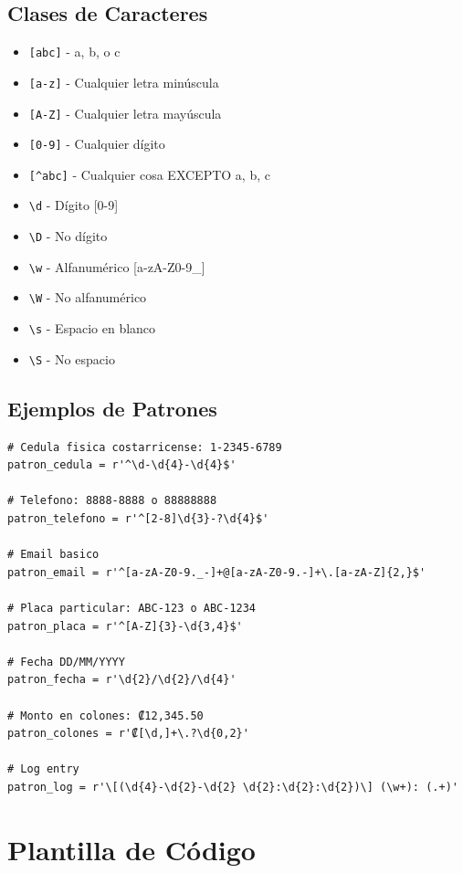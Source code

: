\documentclass[11pt,letterpaper]{article}
\begin{document}
\subsection{Clases de Caracteres}

\begin{itemize}
    \item \texttt{[abc]} - a, b, o c
    \item \texttt{[a-z]} - Cualquier letra minúscula
    \item \texttt{[A-Z]} - Cualquier letra mayúscula
    \item \texttt{[0-9]} - Cualquier dígito
    \item \texttt{[\^{}abc]} - Cualquier cosa EXCEPTO a, b, c
    \item \texttt{\textbackslash d} - Dígito [0-9]
    \item \texttt{\textbackslash D} - No dígito
    \item \texttt{\textbackslash w} - Alfanumérico [a-zA-Z0-9\_]
    \item \texttt{\textbackslash W} - No alfanumérico
    \item \texttt{\textbackslash s} - Espacio en blanco
    \item \texttt{\textbackslash S} - No espacio
\end{itemize}

\subsection{Ejemplos de Patrones}

\begin{lstlisting}[caption={Ejemplos de patrones regex comunes}]
# Cedula fisica costarricense: 1-2345-6789
patron_cedula = r'^\d-\d{4}-\d{4}$'

# Telefono: 8888-8888 o 88888888
patron_telefono = r'^[2-8]\d{3}-?\d{4}$'

# Email basico
patron_email = r'^[a-zA-Z0-9._-]+@[a-zA-Z0-9.-]+\.[a-zA-Z]{2,}$'

# Placa particular: ABC-123 o ABC-1234
patron_placa = r'^[A-Z]{3}-\d{3,4}$'

# Fecha DD/MM/YYYY
patron_fecha = r'\d{2}/\d{2}/\d{4}'

# Monto en colones: ₡12,345.50
patron_colones = r'₡[\d,]+\.?\d{0,2}'

# Log entry
patron_log = r'\[(\d{4}-\d{2}-\d{2} \d{2}:\d{2}:\d{2})\] (\w+): (.+)'
\end{lstlisting}

\section{Plantilla de Código}
\end{document}
